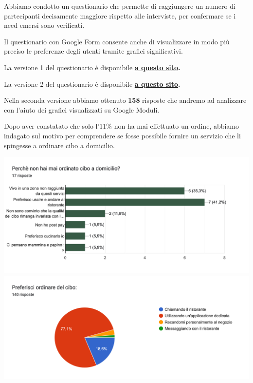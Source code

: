 \documentclass{article}
\begin{document}
\newpage
\vspace{2cm} \par 
{}\vspace{0.5cm}
\par Abbiamo condotto un questionario che permette di raggiungere un numero di partecipanti decisamente maggiore rispetto alle interviste, per confermare se i need emersi sono verificati.\par Il questionario con Google Form consente anche di visualizzare in modo più preciso le preferenze degli utenti tramite grafici significativi.
\par La versione 1 del questionario è disponibile \textbf{\href{https://forms.gle/pBWCBfAxsjULCZRj6}{a questo sito}.}
\par La versione 2 del questionario è disponibile \textbf{\href{https://docs.google.com/forms/d/1ToAwRVi9a8q0_68hbEI7O8ORtodt_uTHuwU9ZtPfk1Q/edit}{a questo sito}.}
\par \vspace{1cm}
Nella seconda versione abbiamo ottenuto \textbf{158} risposte che andremo ad analizzare con l'aiuto dei grafici visualizzati su Google Moduli.\par \vspace{1cm}
\par Dopo aver constatato che solo l'11\% non ha mai effettuato un ordine, abbiamo indagato sul motivo per comprendere se fosse possibile fornire un servizio che li spingesse a ordinare cibo a domicilio.
\vspace{0.5cm}
\par 
\includegraphics[width=\textwidth]{Data/Grafici/Perche_non_ordina.png}
\includegraphics[width=\textwidth]{Data/Grafici/ordinare_cibo.png}
\end{document}
